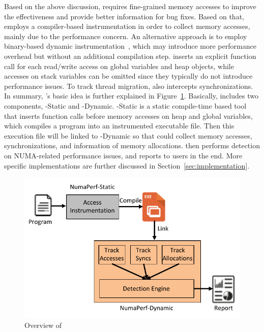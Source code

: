 Based on the above discussion, \NP{} requires  fine-grained memory accesses to improve the effectiveness and provide better information for bug fixes. Based on that, \NP{} employs a compiler-based instrumentation in order to collect memory accesses, mainly due to the performance concern. An alternative approach is to employ binary-based dynamic instrumentation~\cite{DynamoRlO, Valgrind, Pin}, which may introduce more performance overhead but without an additional compilation step. \NP{} inserts an explicit function call for each read/write access on global variables and heap objects, while accesses on stack variables can be omitted since they typically do not introduce performance issues. To track thread migration, \NP{} also intercepts synchronizations. In summary, \NP{}'s basic idea is further explained in Figure~\ref{fig:overview}.  Basically, \NP{} includes two components, \NP{}-Static and \NP{}-Dynamic. \NP{}-Static is a static compile-time based tool that inserts function calls before memory accesses on heap and global variables, which compiles a program into an instrumented executable file. Then this execution file will be linked to \NP{}-Dynamic so that \NP{} could collect memory accesses,  synchronizations, and information of memory allocations. \NP{} then performs detection on NUMA-related performance issues, and reports to users in the end.  More specific implementations are further discussed in Section~\ref{sec:implementation}. 
\begin{figure}[htbp]
\centering
\includegraphics[width=0.98\columnwidth]{figures/overview.pdf}
\caption{Overview of \NP{}\label{fig:overview}}
\end{figure}
